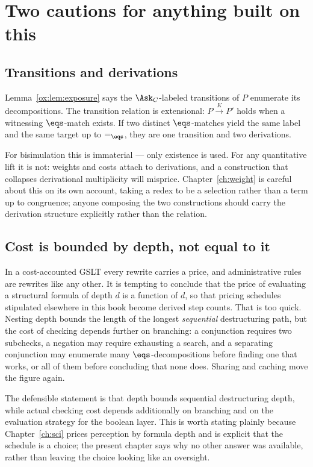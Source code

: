 \section{Two cautions for anything built on this}
\label{ox:sec:cautions}

\subsection{Transitions and derivations}

Lemma~\ref{ox:lem:exposure} says the $\Ask_C$-labeled transitions of $P$ enumerate
its decompositions. The transition relation is extensional: $P \xrightarrow{K} P'$
holds when a witnessing $\eqs$-match exists. If two distinct $\eqs$-matches yield
the same label and the same target up to $=_{\eqs}$, they are one transition and
two derivations.

For bisimulation this is immaterial --- only existence is used. For any
quantitative lift it is not: weights and costs attach to derivations, and a
construction that collapses derivational multiplicity will misprice.
Chapter~\ref{ch:weight} is careful about this on its own account, taking a redex to
be a selection rather than a term up to congruence; anyone composing the two
constructions should carry the derivation structure explicitly rather than the
relation.

\subsection{Cost is bounded by depth, not equal to it}
\label{ox:sec:cost}

In a cost-accounted GSLT every rewrite carries a price, and administrative rules are
rewrites like any other. It is tempting to conclude that the price of evaluating a
structural formula of depth $d$ is a function of $d$, so that pricing schedules
stipulated elsewhere in this book become derived step counts. That is too quick.
Nesting depth bounds the length of the longest \emph{sequential} destructuring
path, but the cost of checking depends further on branching: a conjunction requires
two subchecks, a negation may require exhausting a search, and a separating
conjunction may enumerate many $\eqs$-decompositions before finding one that works,
or all of them before concluding that none does. Sharing and caching move the
figure again.

The defensible statement is that depth bounds sequential destructuring depth, while
actual checking cost depends additionally on branching and on the evaluation
strategy for the boolean layer. This is worth stating plainly because
Chapter~\ref{ch:sci} prices perception by formula depth and is explicit that the
schedule is a choice; the present chapter says why no other answer was available,
rather than leaving the choice looking like an oversight.

